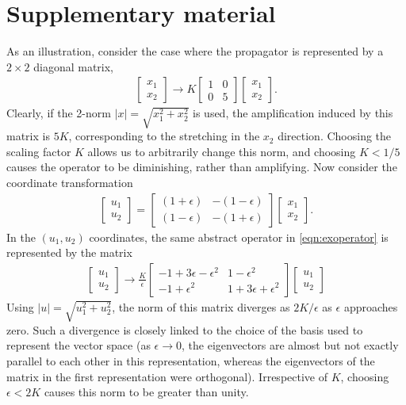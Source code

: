 \documentclass[letterpaper,prl,aps,twocolumn,reprint,superscriptaddress]{revtex4-1}
\begin{document}
\section*{Supplementary material}
As an illustration, consider the case where the propagator is represented by a $2\times 2$ diagonal matrix,
\begin{align}
 \begin{bmatrix} x_1 \\ x_2 \end{bmatrix}
 \to
K \begin{bmatrix} 1 & 0 \\ 0 & 5 \end{bmatrix}
 \begin{bmatrix} x_1 \\ x_2 \end{bmatrix}.
 \label{eqn:exoperator}
\end{align}
Clearly, if the 2-norm $|x| = \sqrt{x_1^2 +x_2^2}$ is used, the amplification induced by this matrix is $5K$, corresponding to the stretching in the $x_2$ direction. Choosing the scaling factor $K$ allows us to arbitrarily change this norm, and choosing $K<1/5$ causes the operator to be diminishing, rather than amplifying. Now consider the coordinate transformation
\begin{align}
 \begin{bmatrix} u_1 \\ u_2 \end{bmatrix}
 =
 \begin{bmatrix} (1+\epsilon) & -(1-\epsilon) \\ (1-\epsilon) & -(1+\epsilon) \end{bmatrix}
 \begin{bmatrix} x_1 \\ x_2 \end{bmatrix}.
 \label{eqn:transform}
\end{align}
In the $(u_1, u_2)$ coordinates, the same abstract operator in \eqref{eqn:exoperator} is represented by the matrix
\begin{align}
 \begin{bmatrix} u_1 \\ u_2 \end{bmatrix}
 \to \frac{K}{\epsilon}
 \begin{bmatrix} -1+3\epsilon-\epsilon^2 & 1-\epsilon^2 \\ -1+\epsilon^2 & 1+3\epsilon+\epsilon^2 \end{bmatrix}
 \begin{bmatrix} u_1 \\ u_2 \end{bmatrix}
\end{align}
Using $|u| = \sqrt{u_1^2 + u_2^2}$, the norm of this matrix diverges as $2K/\epsilon$ as $\epsilon$ approaches zero. Such a divergence is closely linked to the choice of the basis used to represent the vector space (as $\epsilon\to 0$, the eigenvectors are almost but not exactly parallel to each other in this representation, whereas the eigenvectors of the matrix in the first representation were orthogonal). Irrespective of $K$, choosing $\epsilon < 2K$ causes this norm to be greater than unity. 
\end{document}
